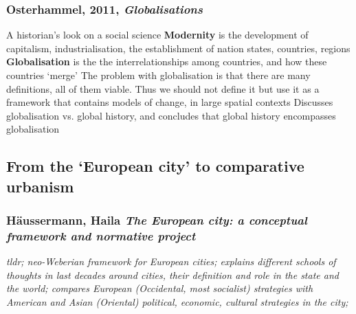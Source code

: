 \documentclass{article}
\begin{document}
\subsubsection{Osterhammel, 2011, \textit{Globalisations}}


\begin{outline}
	\1 A historian's look on a social science
	\1 \textbf{Modernity} is the development of capitalism, industrialisation, the establishment of nation states, countries, regions
	\1 \textbf{Globalisation} is the the interrelationships among countries, and how these countries `merge'
	\1 The problem with globalisation is that there are many definitions, all of them viable. Thus we should not define it but use it as a framework that contains models of change, in large spatial contexts
	\1 Discusses globalisation vs. global history, and concludes that global history encompasses globalisation
\end{outline}

\subsection{From the `European city' to comparative urbanism}

\subsubsection{Häussermann, Haila \textit{The European city: a conceptual framework and normative project}}

\textit{tldr; neo-Weberian framework for European cities; explains different schools of thoughts in last decades around cities, their definition and role in the state and the world; compares European (Occidental, most socialist) strategies with American and Asian (Oriental) political, economic, cultural strategies in the city;}
\end{document}
